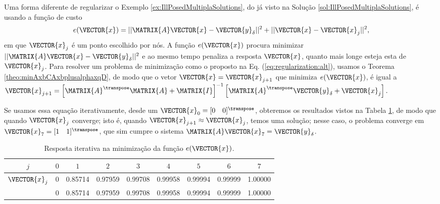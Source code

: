 \begin{SolutionT}
Uma forma diferente de regularizar o Exemplo \ref{ex:IllPosedMultiplaSolutions}, 
do já visto na Solução \ref{sol:IllPosedMultiplaSolutions},
é usando a função de custo 
\begin{equation}\label{eq:regularization:alt}
e(\VECTOR{x})=||\MATRIX{A}\VECTOR{x}-\VECTOR{y}_{\delta}||^2+||\VECTOR{x}-\VECTOR{x}_{j}||^2,
\end{equation}
em que $\VECTOR{x}_{j}$ é um ponto escolhido por nós.
A função $e(\VECTOR{x})$ procura minimizar $||\MATRIX{A}\VECTOR{x}-\VECTOR{y}_{\delta}||^2$
e ao mesmo tempo penaliza a resposta $\VECTOR{x}$,
quanto mais longe esteja esta de $\VECTOR{x}_{j}$.
Para resolver um problema de minimização como o proposto na Eq. (\ref{eq:regularization:alt}),
usamos o Teorema \ref{theo:minAxbCAxbplusalphaxqD}, de modo que o vetor 
$\VECTOR{x}=\VECTOR{x}_{j+1}$ que minimiza $e(\VECTOR{x})$,
é igual a
$
\VECTOR{x}_{j+1} =
\left[ \MATRIX{A}^{\transpose}\MATRIX{A} +\MATRIX{I}\right]^{-1}\left[ \MATRIX{A}^{\transpose} \VECTOR{y}_{\delta}+ \VECTOR{x}_{j}\right].
$

Se usamos essa equação iterativamente, desde um $\VECTOR{x}_{0}=[0\quad 0]^{\transpose}$, 
obteremos os resultados vistos na Tabela \ref{tab:IllPosedMultiplaSolution},
de modo que quando $\VECTOR{x}_{j}$ converge; isto é, quando $\VECTOR{x}_{j+1}\approx \VECTOR{x}_{j}$,
temos uma solução; nesse caso, o problema converge em $\VECTOR{x}_{7}=[1\quad 1]^{\transpose}$,
que sim cumpre o sistema $\MATRIX{A}\VECTOR{x}_{7}=\VECTOR{y}_{\delta}$.
\end{SolutionT}


\begin{table}[h!]
\centering
 \begin{tabular}{|c|c|c|c|c|c|c|c|c|} 
 \hline
 $j$ & $0$ & $1$ & $2$ & $3$ & $4$ & $5$ & $6$ & $7$ \\ \hline
 \hline
 $\VECTOR{x}_{j}$ & 0 & 0.85714 & 0.97959 & 0.99708 & 0.99958 & 0.99994 & 0.99999 & 1.00000 \\
 ~                & 0 & 0.85714 & 0.97959 & 0.99708 & 0.99958 & 0.99994 & 0.99999 & 1.00000 \\
 \hline
 \end{tabular}
\caption{Resposta iterativa na minimização da função $e(\VECTOR{x})$.}
\label{tab:IllPosedMultiplaSolution}
\end{table}



